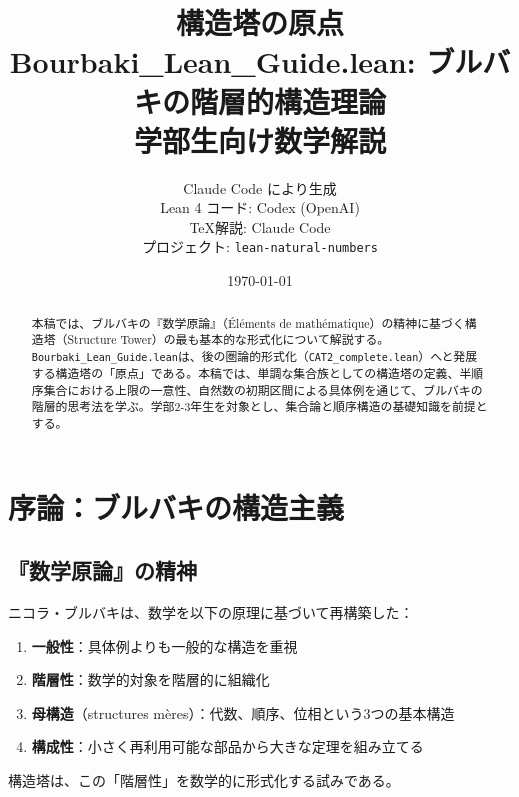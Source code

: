 \documentclass[a4paper,12pt]{ltjsarticle}
\title{構造塔の原点\\
  {\large Bourbaki\_Lean\_Guide.lean: ブルバキの階層的構造理論}\\
  {\large 学部生向け数学解説}}
\author{Claude Code により生成\\
  {\small Lean 4 コード: Codex (OpenAI)}\\
  {\small \TeX 解説: Claude Code}\\
  {\small プロジェクト: \texttt{lean-natural-numbers}}}
\date{\today}
\theoremstyle{definition}
\begin{document}
\maketitle

\begin{abstract}
本稿では、ブルバキの『数学原論』（Éléments de mathématique）の精神に基づく構造塔（Structure Tower）の最も基本的な形式化について解説する。\texttt{Bourbaki\_Lean\_Guide.lean}は、後の圏論的形式化（\texttt{CAT2\_complete.lean}）へと発展する構造塔の「原点」である。本稿では、単調な集合族としての構造塔の定義、半順序集合における上限の一意性、自然数の初期区間による具体例を通じて、ブルバキの階層的思考法を学ぶ。学部2-3年生を対象とし、集合論と順序構造の基礎知識を前提とする。
\end{abstract}

\tableofcontents

\section{序論：ブルバキの構造主義}

\subsection{『数学原論』の精神}

\begin{historical}[ブルバキの数学哲学]
ニコラ・ブルバキは、数学を以下の原理に基づいて再構築した：

\begin{enumerate}
\item \textbf{一般性}：具体例よりも一般的な構造を重視
\item \textbf{階層性}：数学的対象を階層的に組織化
\item \textbf{母構造}（structures mères）：代数、順序、位相という3つの基本構造
\item \textbf{構成性}：小さく再利用可能な部品から大きな定理を組み立てる
\end{enumerate}

構造塔は、この「階層性」を数学的に形式化する試みである。
\end{historical}

\begin{center}
\end{center}
\end{document}
